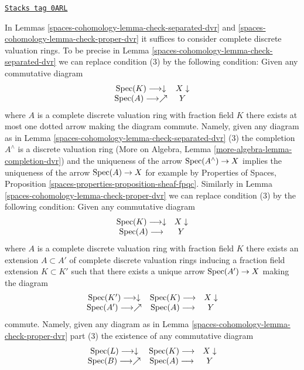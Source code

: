 \begin{remark}

\label{spaces-cohomology-remark-variant}
\href{https://stacks.math.columbia.edu/tag/0ARL}{\texttt{Stacks tag 0ARL}}

In Lemmas \ref{spaces-cohomology-lemma-check-separated-dvr} and \ref{spaces-cohomology-lemma-check-proper-dvr}
it suffices to consider complete discrete valuation rings.
To be precise in Lemma \ref{spaces-cohomology-lemma-check-separated-dvr} we can replace
condition (3) by the following condition: Given any commutative diagram
$$
\begin{array}{cc}\operatorname{Spec}(K) \longrightarrow\downarrow & X \downarrow \\ \operatorname{Spec}(A) \longrightarrow\nearrow & Y\end{array}
$$
where $A$ is a complete discrete valuation ring with fraction field $K$
there exists at most one dotted arrow making the diagram commute. Namely, given
any diagram as in Lemma \ref{spaces-cohomology-lemma-check-separated-dvr} (3)
the completion $A^\wedge$ is a discrete valuation ring
(More on Algebra, Lemma \ref{more-algebra-lemma-completion-dvr})
and the uniqueness of the arrow $\operatorname{Spec}(A^\wedge) \to X$
implies the uniqueness of the arrow $\operatorname{Spec}(A) \to X$
for example by Properties of Spaces, Proposition
\ref{spaces-properties-proposition-sheaf-fpqc}.
Similarly in Lemma \ref{spaces-cohomology-lemma-check-proper-dvr}
we can replace condition (3) by the following condition:
Given any commutative diagram
$$
\begin{array}{cc}\operatorname{Spec}(K) \longrightarrow\downarrow & X \downarrow \\ \operatorname{Spec}(A) \longrightarrow & Y\end{array}
$$
where $A$ is a complete discrete valuation ring with fraction field $K$
there exists an extension $A \subset A'$ of complete discrete valuation rings
inducing a fraction field extension $K \subset K'$ such that there exists a
unique arrow $\operatorname{Spec}(A') \to X$ making the diagram
$$
\begin{array}{ccc}\operatorname{Spec}(K') \longrightarrow\downarrow & \operatorname{Spec}(K) \longrightarrow & X \downarrow \\ \operatorname{Spec}(A') \longrightarrow\nearrow & \operatorname{Spec}(A) \longrightarrow & Y\end{array}
$$
commute. Namely, given any diagram as in Lemma \ref{spaces-cohomology-lemma-check-proper-dvr}
part (3) the existence of any commutative diagram
$$
\begin{array}{ccc}\operatorname{Spec}(L) \longrightarrow\downarrow & \operatorname{Spec}(K) \longrightarrow & X \downarrow \\ \operatorname{Spec}(B) \longrightarrow\nearrow & \operatorname{Spec}(A) \longrightarrow & Y\end{array}
$$
\end{remark}
